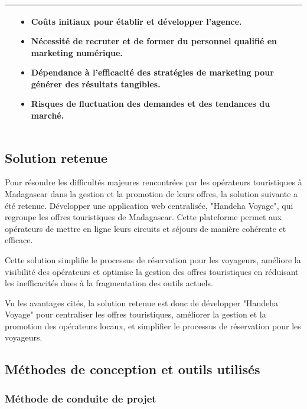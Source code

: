\documentclass[12pt]{report}
\begin{document}
\begin{table}[h]
{\begin{tabular}{|p{5cm}|p{5cm}|p{5cm}|}
\begin{itemize}
						\end{itemize}
						&
						\begin{itemize}
							\item Coûts initiaux pour établir et développer l'agence.
							\item Nécessité de recruter et de former du personnel qualifié en marketing numérique.
							\item Dépendance à l'efficacité des stratégies de marketing pour générer des résultats tangibles.
							\item Risques de fluctuation des demandes et des tendances du marché.
						\end{itemize}\\						

						\hline
				    \end{tabular}
				  }
				\end{table}
				\clearpage
				\subsection{Solution retenue}

				\hspace{15pt} Pour résoudre les difficultés majeures rencontrées par les opérateurs touristiques à Madagascar dans la gestion et la promotion de leurs offres, la solution suivante a été retenue. Développer une application web centralisée, "Handeha Voyage", qui regroupe les offres touristiques de Madagascar. Cette plateforme permet aux opérateurs de mettre en ligne leurs circuits et séjours de manière cohérente et efficace.

				Cette solution simplifie le processus de réservation pour les voyageurs, améliore la visibilité des opérateurs et optimise la gestion des offres touristiques en réduisant les inefficacités dues à la fragmentation des outils actuels.

				Vu les avantages cités, la solution retenue est donc de développer "Handeha Voyage" pour centraliser les offres touristiques, améliorer la gestion et la promotion des opérateurs locaux, et simplifier le processus de réservation pour les voyageurs.

				\subsection{Méthodes de conception et outils utilisés}
				\subsubsection{Méthode de conduite de projet}
\end{document}

